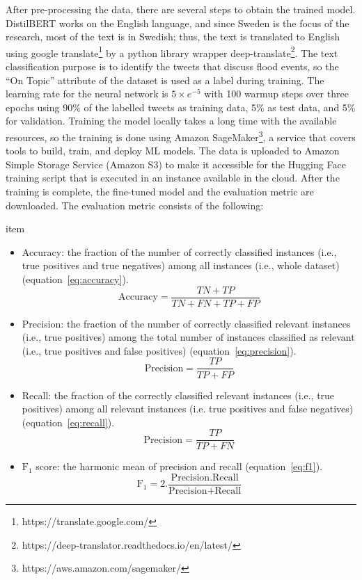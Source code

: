After pre-processing the data, there are several steps to obtain the trained model. DistilBERT works
on the English language, and since Sweden is the focus of the research, most of the text is in
Swedish; thus, the text is translated to English using google
translate\footnote{https://translate.google.com/} by a python library wrapper
deep-translate\footnote{https://deep-translator.readthedocs.io/en/latest/}. The text classification
purpose is to identify the tweets that discuss flood events, so the ``On Topic'' attribute of the
dataset is used as a label during training. The learning rate for the neural network is $5\times e^{-5}$ with
100 warmup steps over three epochs using 90\% of the labelled tweets as training data, 5\% as test
data, and 5\% for validation. Training the model locally takes a long time with the available
resources, so the training is done using Amazon
SageMaker\footnote{https://aws.amazon.com/sagemaker/}, a service that covers tools to build, train,
and deploy \ac{ML} models. The data is uploaded to Amazon Simple Storage Service (Amazon S3) to make it
accessible for the Hugging Face training script that is executed in an instance available in the
cloud. After the training is complete, the fine-tuned model and the evaluation metric are
downloaded. The evaluation metric consists of the following:

item
\begin{itemize}
  \item Accuracy: the fraction of the number of correctly classified instances (i.e., true positives
    and true negatives) among all instances (i.e., whole dataset) (equation~\ref{eq:accuracy}).
 \begin{equation}
   \text{Accuracy}=\frac{TN+TP}{TN+FN+TP+FP} 
   \label{eq:accuracy}
\end{equation}
\item Precision: the fraction of the number of correctly classified relevant instances (i.e., true
  positives) among the total number of instances classified as relevant (i.e., true positives and
  false positives) (equation~\ref{eq:precision}).
 \begin{equation}
   \text{Precision}=\frac{TP}{TP+FP} 
   \label{eq:precision}
\end{equation}
\item Recall: the fraction of the correctly classified relevant instances (i.e., true positives)
  among all relevant instances (i.e. true positives and false negatives) (equation~\ref{eq:recall}).
 \begin{equation}
   \text{Precision}=\frac{TP}{TP+FN} 
   \label{eq:recall}
\end{equation}
\item $\text{F}_1$ score: the harmonic mean of precision and recall (equation~\ref{eq:f1}).
 \begin{equation}
   \text{F}_1 =2.\frac{\text{Precision}.\text{Recall}}{\text{Precision}+\text{Recall}} 
   \label{eq:f1}
\end{equation}
\end{itemize}
  


